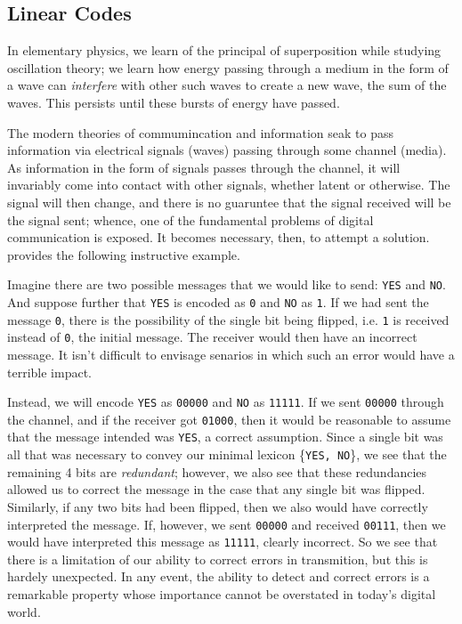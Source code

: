 \documentclass[../../../main]{subfiles}
\begin{document}
\subsection{Linear Codes}

In elementary physics, we learn of the principal of superposition while studying oscillation theory; we learn how energy passing through a medium in the form of a wave can {\it interfere} with other such waves to create a new wave, the sum of the waves. This persists until these bursts of energy have passed.

The modern theories of commumincation and information seak to pass information via electrical signals (waves) passing through some channel (media). As information in the form of signals passes through the channel, it will invariably come into contact with other signals, whether latent or otherwise. The signal will then change, and there is no guaruntee that the signal received will be the signal sent; whence, one of the fundamental problems of digital communication is exposed. It becomes necessary, then, to attempt a solution. \cite{hill-coding} provides the following instructive example.

Imagine there are two possible messages that we would like to send: {\tt YES} and {\tt NO}. And suppose further that {\tt YES} is encoded as {\tt 0} and {\tt NO} as {\tt 1}. If we had sent the message {\tt 0}, there is the possibility of the single bit being flipped, i.e. {\tt 1} is received instead of {\tt 0}, the initial message. The receiver would then have an incorrect message. It isn't difficult to envisage senarios in which such an error would have a terrible impact.

Instead, we will encode {\tt YES} as {\tt 00000} and {\tt NO} as {\tt 11111}. If we sent {\tt 00000} through the channel, and if the receiver got {\tt 01000}, then it would be reasonable to assume that the message intended was {\tt YES}, a correct assumption. Since a single bit was all that was necessary to convey our minimal lexicon \{{\tt YES, NO}\}, we see that the remaining 4 bits are {\it redundant}; however, we also see that these redundancies allowed us to correct the message in the case that any single bit was flipped. Similarly, if any two bits had been flipped, then we also would have correctly interpreted the message. If, however, we sent {\tt 00000} and received {\tt 00111}, then we would have interpreted this message as {\tt 11111}, clearly incorrect. So we see that there is a limitation of our ability to correct errors in transmition, but this is hardely unexpected. In any event, the ability to detect and correct errors is a remarkable property whose importance cannot be overstated in today's digital world.
\end{document}
